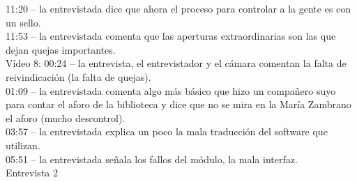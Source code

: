 \documentclass[12pt]{article}
\begin{document}
11:20 – la entrevistada dice que ahora el proceso para controlar a la gente es con un sello.\\
11:53 – la entrevistada comenta que las aperturas extraordinarias son las que dejan quejas importantes.\\
Vídeo 8:
00:24 – la entrevista, el entrevistador y el cámara comentan la falta de reivindicación (la falta de quejas).\\
01:09 – la entrevistada comenta algo más básico que hizo un compañero suyo para contar el aforo de la biblioteca y dice que no se mira en la María Zambrano el aforo (mucho descontrol).\\
03:57 – la entrevistada explica un poco la mala traducción del software que utilizan.\\
05:51 – la entrevistada señala los fallos del módulo, la mala interfaz.\\

Entrevista 2
\end{document}
